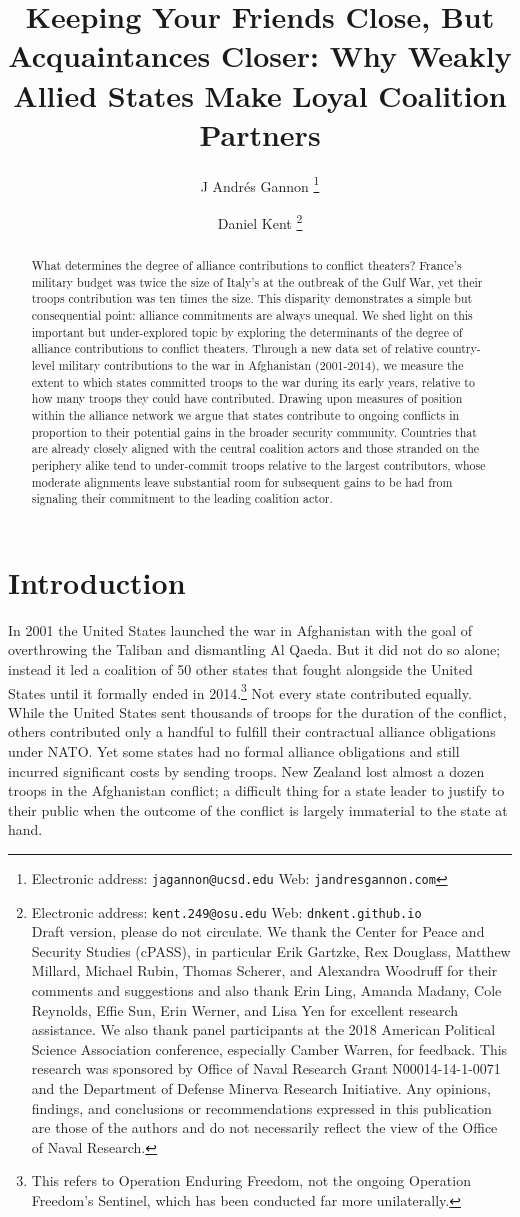 \documentclass[12pt,letterpaper]{article}
\title{Keeping Your Friends Close, But Acquaintances Closer: Why Weakly Allied States Make Loyal Coalition Partners}
\author{J Andr\'{e}s Gannon%
	\thanks{Electronic address: \texttt{jagannon@ucsd.edu} Web: \texttt{jandresgannon.com}}}
\affil{Department of Political Science \\ University of California, San Diego}
\author{Daniel Kent%
	\thanks{Electronic address: \texttt{kent.249@osu.edu} Web: \texttt{dnkent.github.io} \\ Draft version, please do not circulate. We thank the Center for Peace and Security Studies (cPASS), in particular Erik Gartzke, Rex Douglass, Matthew Millard, Michael Rubin, Thomas Scherer, and Alexandra Woodruff for their comments and suggestions and also thank Erin Ling, Amanda Madany, Cole Reynolds, Effie Sun, Erin Werner, and Lisa Yen for excellent research assistance. We also thank panel participants at the 2018 American Political Science Association conference, especially Camber Warren, for feedback. This research was sponsored by Office of Naval Research Grant N00014-14-1-0071 and the Department of Defense Minerva Research Initiative. Any opinions, findings, and conclusions or recommendations expressed in this publication are those of the authors and do not necessarily reflect the view of the Office of Naval Research.}}
\affil{Department of Political Science \\ The Ohio State University}
\begin{document}
\maketitle

\begin{abstract}
What determines the degree of alliance contributions to conflict theaters? France's military budget was twice the size of Italy's at the outbreak of the Gulf War, yet their troops contribution was ten times the size. This disparity demonstrates a simple but consequential point: alliance commitments are always unequal. We shed light on this important but under-explored topic by exploring the determinants of the degree of alliance contributions to conflict theaters. Through a new data set of relative country-level military contributions to the war in Afghanistan (2001-2014), we measure the extent to which states committed troops to the war during its early years, relative to how many troops they could have contributed. Drawing upon measures of position within the alliance network we argue that states contribute to ongoing conflicts in proportion to their potential gains in the broader security community. Countries that are already closely aligned with the central coalition actors and those stranded on the periphery alike tend to under-commit troops relative to the largest contributors, whose moderate alignments leave substantial room for subsequent gains to be had from signaling their commitment to the leading coalition actor.
\end{abstract}

\doublespacing
\section{Introduction}
	In 2001 the United States launched the war in Afghanistan with the goal of overthrowing the Taliban and dismantling Al Qaeda. But it did not do so alone; instead it led a coalition of 50 other states that fought alongside the United States until it formally ended in 2014.\footnote{This refers to Operation Enduring Freedom, not the ongoing Operation Freedom's Sentinel, which has been conducted far more unilaterally.} Not every state contributed equally. While the United States sent thousands of troops for the duration of the conflict, others contributed only a handful to fulfill their contractual alliance obligations under NATO. Yet some states had no formal alliance obligations and still incurred significant costs by sending troops. New Zealand lost almost a dozen troops in the Afghanistan conflict; a difficult thing for a state leader to justify to their public when the outcome of the conflict is largely immaterial to the state at hand.
\end{document}

